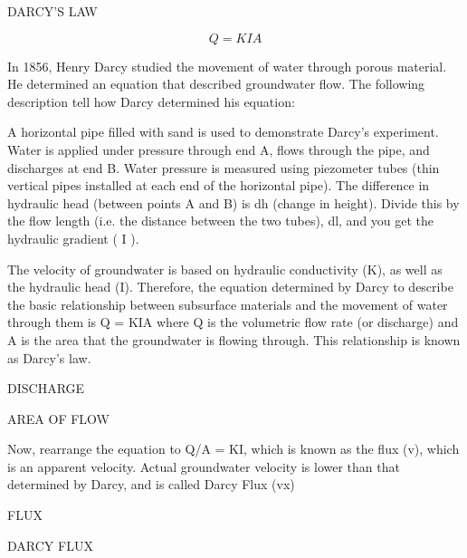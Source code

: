 \documentclass{book}\usepackage{knitr}
\begin{document}
DARCY'S LAW

\begin{equation}
Q = KIA
\end{equation}

In 1856, Henry Darcy studied the movement of water through porous material. He determined an equation that described groundwater flow. The following description tell how Darcy determined his equation:

A horizontal pipe filled with sand is used to demonstrate Darcy's experiment. Water is applied under pressure through end A, flows through the pipe, and discharges at end B. Water pressure is measured using piezometer tubes (thin vertical pipes installed at each end of the horizontal pipe). The difference in hydraulic head (between points A and B) is dh (change in height). Divide this by the flow length (i.e. the distance between the two tubes), dl, and you get the hydraulic gradient ( I ).

The velocity of groundwater is based on hydraulic conductivity (K), as well as the hydraulic head (I). Therefore, the equation determined by Darcy to describe the basic relationship between subsurface materials and the movement of water through them is Q = KIA where Q is the volumetric flow rate (or discharge) and A is the area that the groundwater is flowing through. This relationship is known as Darcy’s law.

DISCHARGE

AREA OF FLOW

Now, rearrange the equation to Q/A = KI, which is known as the flux (v), which is an apparent velocity. Actual groundwater velocity is lower than that determined by Darcy, and is called Darcy Flux (vx)

FLUX

DARCY FLUX
\end{document}
